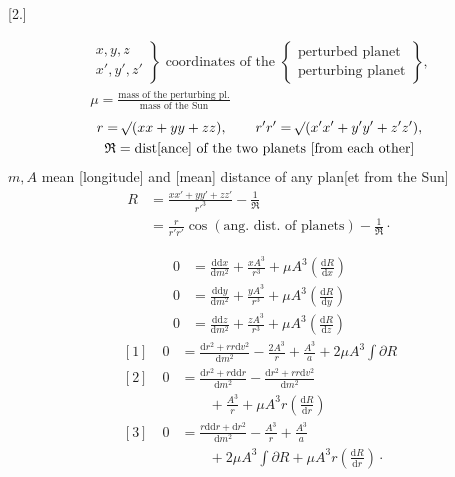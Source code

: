\par\bigskip
\hypertarget{native-384-ceres2}{}
\begin{center}
[2.]\par
\medskip
{}
\end{center}
\[
\begin{gathered}
\left.\begin{array}{c}x,y,z\\x',y',z'\end{array}\right\}
\text{ coordinates of the }
\left\{\begin{array}{l}\text{perturbed planet}\\\text{perturbing planet}\end{array}\right\},\\[4pt]
\mu=\frac{\text{mass of the perturbing pl.}}{\text{mass of the Sun}}
\end{gathered}
\]
\[
\begin{gathered}
r=\mathord{{}^{}\!\surd}(xx+yy+zz),\qquad
r'r'=\mathord{{}^{}\!\surd}(x'x'+y'y'+z'z'),\\
\mathfrak{R}=\text{dist[ance] of the two planets [from each other]}
\end{gathered}
\]
\noindent\(m,A\) mean [longitude] and [mean] distance of any plan[et from the Sun]
\[
\begin{aligned}
R&=\frac{xx'+yy'+zz'}{r'^{3}}-\frac{1}{\mathfrak{R}}\\
 &=\frac{r}{r'r'}\cos(\text{ang. dist. of planets})-\frac{1}{\mathfrak{R}}\mathpunct{\cdot}
\end{aligned}
\]
\par\medskip
\noindent\hspace*{\parindent}
\[
\begin{aligned}
0&=\frac{\mathrm{d}\mathrm{d}x}{\mathrm{d}m^{2}}+\frac{xA^{3}}{r^{3}}+\mu A^{3}\left(\frac{\mathrm{d}R}{\mathrm{d}x}\right)\\[4pt]
0&=\frac{\mathrm{d}\mathrm{d}y}{\mathrm{d}m^{2}}+\frac{yA^{3}}{r^{3}}+\mu A^{3}\left(\frac{\mathrm{d}R}{\mathrm{d}y}\right)\\[4pt]
0&=\frac{\mathrm{d}\mathrm{d}z}{\mathrm{d}m^{2}}+\frac{zA^{3}}{r^{3}}+\mu A^{3}\left(\frac{\mathrm{d}R}{\mathrm{d}z}\right)
\end{aligned}
\]
\[
\begin{aligned}
[1]\quad 0&=\frac{\mathrm{d}r^{2}+rr\mathrm{d}v^{2}}{\mathrm{d}m^{2}}-\frac{2A^{3}}{r}+\frac{A^{3}}{a}+2\mu A^{3}\int\partial R\\[6pt]
[2]\quad 0&=\frac{\mathrm{d}r^{2}+r\mathrm{d}\mathrm{d}r}{\mathrm{d}m^{2}}-\frac{\mathrm{d}r^{2}+rr\mathrm{d}v^{2}}{\mathrm{d}m^{2}}\\
&\qquad+\frac{A^{3}}{r}+\mu A^{3}r\left(\frac{\mathrm{d}R}{\mathrm{d}r}\right)\\[6pt]
[3]\quad 0&=\frac{r\mathrm{d}\mathrm{d}r+\mathrm{d}r^{2}}{\mathrm{d}m^{2}}-\frac{A^{3}}{r}+\frac{A^{3}}{a}\\
&\qquad+2\mu A^{3}\int\partial R+\mu A^{3}r\left(\frac{\mathrm{d}R}{\mathrm{d}r}\right)\mathpunct{\cdot}
\end{aligned}
\]
